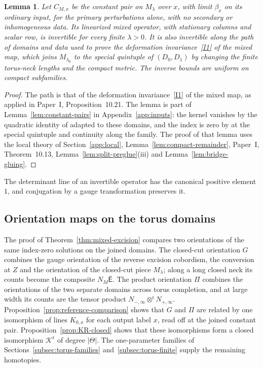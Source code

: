 \documentclass[11pt]{amsart}
\newtheorem{lemma}[theorem]{Lemma}
\theoremstyle{definition}
\theoremstyle{remark}
\theoremstyle{plain}
\numberwithin{equation}{section}
\begin{document}
\begin{lemma}\label{lem:CM-invertible}
Let $C_{M,x}$ be the constant pair on $M_\lambda$ over $x$, with limit
$\beta_x$ on its ordinary input, for the primary perturbations alone, with
no secondary or inhomogeneous data. Its linearized mixed operator, with stationary
columns and scalar row, is invertible for every finite $\lambda>0$. It is
also invertible along the path of domains and data used to prove the
deformation invariance~\ref{I1} of the mixed map, which joins $M_{\lambda_0}$ to the special
quintuple of $(D_0,D_1)$ by changing the finite torus-neck lengths and
the compact metric. The inverse bounds are uniform on compact
subfamilies.
\end{lemma}
\begin{proof}
The path is that of the deformation invariance~\ref{I1} of the mixed map, as applied
in Paper~I, Proposition~10.21. The lemma is part of
Lemma~\ref{lem:constant-pairs} in
Appendix~\ref{app:inputs}: the kernel vanishes by the quadratic identity
of \cite[Lemma~4.40]{DFL} adapted to these domains, and the index is
zero by \cite[Proposition~3.19]{DFL} at the special quintuple and
continuity along the family. The proof of that lemma uses the local
theory of Section~\ref{app:local}, Lemma~\ref{lem:compact-remainder},
Paper~I, Theorem~10.13, Lemma~\ref{lem:split-preglue}(iii) and
Lemma~\ref{lem:bridge-gluing}.
\end{proof}

The determinant line of an invertible operator has the canonical
positive element $1$, and conjugation by a gauge transformation
preserves it.

\subsection{Orientation maps on the torus domains}
\label{subsec:torus-maps}
The proof of Theorem~\ref{thm:mixed-excision} compares two orientations of
the same index-zero solutions on the joined domains. The closed-cut
orientation $G$ combines the gauge orientation of the reverse excision
cobordism, the conversion at $Z$ and the orientation of the closed-cut
piece $M_\lambda$; along a long closed neck its counts become the composite
$N_M\overline{\mathsf E}$. The product orientation $\Pi$ combines the
orientations of the two separate domains across torus completion, and at
large width its counts are the tensor product
$N_{-,\infty}\otimes^{\mathrm r}N_{+,\infty}$. Proposition~\ref{prop:reference-comparison}
shows that $G$ and $\Pi$ are related by one isomorphism of lines $K_{0,x}$ for
each output label $x$, read off at the joined constant pair.
Proposition~\ref{prop:KR-closed} shows that these isomorphisms form a closed
isomorphism $\mathcal K^{\mathrm r}$ of degree $|\Theta|$. The one-parameter families of
Sections~\ref{subsec:torus-families} and~\ref{subsec:torus-finite} supply
the remaining homotopies.
\end{document}
